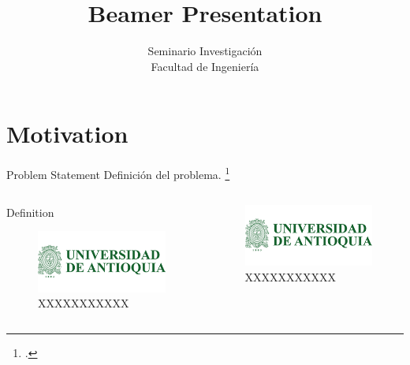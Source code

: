 \documentclass{beamer}
\title{Beamer Presentation}
\author{Seminario Investigación\\Facultad de Ingeniería}
\begin{document}
	
	\frame[plain]{\titlepage}
	
	\section{Motivation}
	
	\begin{frame}{Problem Statement}
Definición del problema.
\footcitetext{Rasmunssen05}

	
	\begin{columns}
		\begin{column}{0.45\linewidth}
			\begin{block}{Definition}
				\begin{figure}
				\includegraphics[width=0.5\linewidth]{logos/logoUdeA}
				\caption{XXXXXXXXXXX}
			\end{figure}
			\end{block}
		\end{column}
	\begin{column}{0.45\linewidth}
		\begin{figure}
			\includegraphics[width=0.5\linewidth]{logos/logoUdeA}
			\caption{XXXXXXXXXXX}
		\end{figure}
	\end{column}
	\end{columns}


\end{frame}
\end{document}
